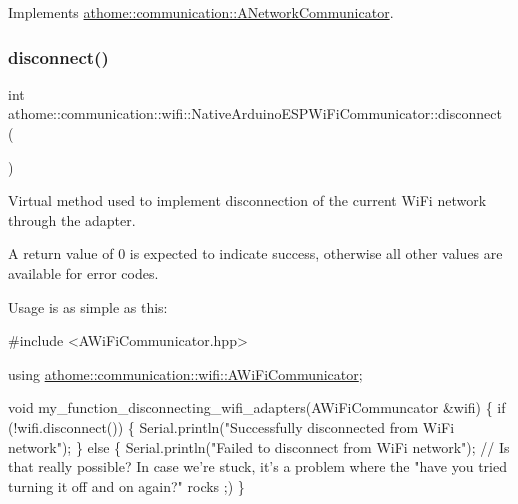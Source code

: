 Implements \mbox{\hyperlink{classathome_1_1communication_1_1_a_network_communicator_a370176dae8f38225446e83a132dbcff7}{athome\+::communication\+::\+A\+Network\+Communicator}}.

\mbox{\label{classathome_1_1communication_1_1wifi_1_1_native_arduino_e_s_p_wi_fi_communicator_a3787e850d48d149ee1392ebfb2920bb3}} 
\subsubsection{\texorpdfstring{disconnect()}{disconnect()}}
{\footnotesize\ttfamily int athome\+::communication\+::wifi\+::\+Native\+Arduino\+E\+S\+P\+Wi\+Fi\+Communicator\+::disconnect (\begin{DoxyParamCaption}{ }\end{DoxyParamCaption})\hspace{0.3cm}{\ttfamily [virtual]}}

Virtual method used to implement disconnection of the current Wi\+Fi network through the adapter.

A return value of 0 is expected to indicate success, otherwise all other values are available for error codes.

Usage is as simple as this\+:


\begin{DoxyCode}
\textcolor{preprocessor}{#include <AWiFiCommunicator.hpp>}

\textcolor{keyword}{using} \mbox{\hyperlink{classathome_1_1communication_1_1wifi_1_1_a_wi_fi_communicator}{athome::communication::wifi::AWiFiCommunicator}};

\textcolor{keywordtype}{void} my\_function\_disconnecting\_wifi\_adapters(AWiFiCommuncator &wifi) \{
  \textcolor{keywordflow}{if} (!wifi.disconnect()) \{
    Serial.println(\textcolor{stringliteral}{"Successfully disconnected from WiFi network"});
  \} \textcolor{keywordflow}{else} \{
    Serial.println(\textcolor{stringliteral}{"Failed to disconnect from WiFi network"}); \textcolor{comment}{// Is that}
really possible? In \textcolor{keywordflow}{case} we\textcolor{stringliteral}{'re stuck, it'}s a problem where the \textcolor{stringliteral}{"have you}
\textcolor{stringliteral}{tried turning it off and on again?"} rocks ;)
\}
\end{DoxyCode}
 

